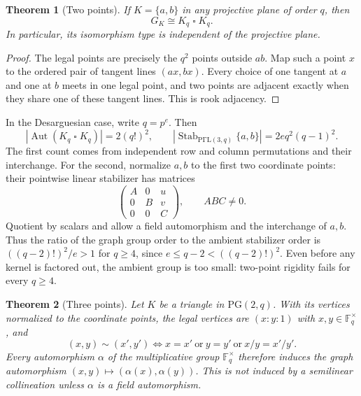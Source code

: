 \documentclass[11pt]{article}
\newtheorem{theorem}{Theorem}[section]
\theoremstyle{definition}
\theoremstyle{remark}
\newcommand{\F}{\mathbb F}
\newcommand{\PG}{\mathrm{PG}}
\newcommand{\PGammaL}{\mathrm{P\Gamma L}}
\newcommand{\Aut}{\operatorname{Aut}}
\newcommand{\Stab}{\operatorname{Stab}}
\begin{document}
\begin{theorem}[Two points]\label{thm:rook}
If $K=\{a,b\}$ in any projective plane of order $q$, then
\[
  G_K\cong K_q\mathbin{\square}K_q.
\]
In particular, its isomorphism type is independent of the projective plane.
\end{theorem}

\begin{proof}
The legal points are precisely the $q^2$ points outside $ab$.  Map such a
point $x$ to the ordered pair of tangent lines $(ax,bx)$.  Every choice of
one tangent at $a$ and one at $b$ meets in one legal point, and two points
are adjacent exactly when they share one of these tangent lines.  This is
rook adjacency.
\end{proof}

In the Desarguesian case, write $q=p^e$. Then
\[
 |\Aut(K_q\mathbin{\square}K_q)|=2(q!)^2,
 \qquad |\Stab_{\PGammaL(3,q)}\{a,b\}|=2e q^2(q-1)^2.
\]
The first count comes from independent row and column permutations and
their interchange. For the second, normalize $a,b$ to the first two
coordinate points: their pointwise linear stabilizer has matrices
\[
 \begin{pmatrix} A&0&u\\0&B&v\\0&0&C\end{pmatrix},
 \qquad ABC\ne0.
\]
Quotient by scalars and allow a field automorphism and the interchange
of $a,b$. Thus the ratio of the graph group order to the ambient
stabilizer order is $((q-2)!)^2/e>1$ for $q\ge4$, since
$e\le q-2<((q-2)!)^2$. Even before any kernel is factored out,
the ambient group is too small: two-point rigidity fails for every $q\ge4$.

\begin{theorem}[Three points]\label{thm:triangle}
Let $K$ be a triangle in $\PG(2,q)$.  With its vertices normalized to the
coordinate points, the legal vertices are $(x:y:1)$ with
$x,y\in\F_q^\times$, and
\begin{equation}
 (x,y)\sim(x',y')
 \Longleftrightarrow
 x=x'\ \text{or}\ y=y'\ \text{or}\ x/y=x'/y'.
 \label{eq:triangle}
\end{equation}
Every automorphism $\alpha$ of the multiplicative group $\F_q^\times$ therefore
induces the graph automorphism $(x,y)\mapsto(\alpha(x),\alpha(y))$.  This is
not induced by a semilinear collineation unless $\alpha$ is a field
automorphism.
\end{theorem}
\end{document}
